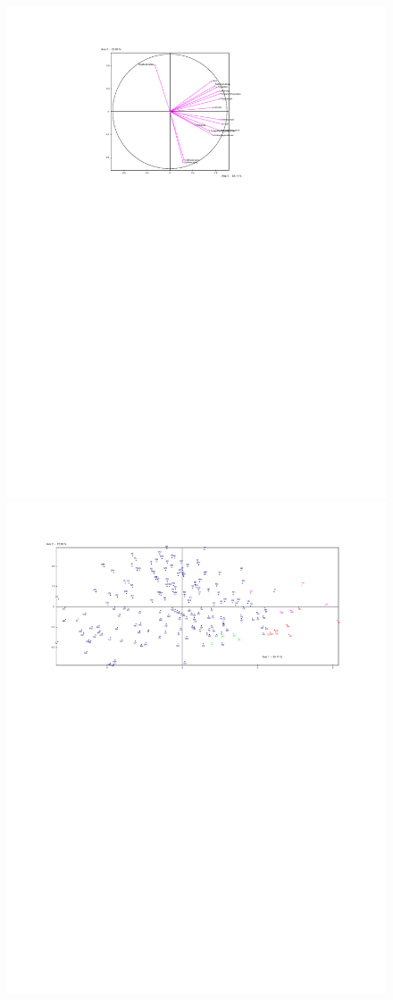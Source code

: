 \documentclass[a4paper,10pt,twocolumn]{article}
\begin{document}
\begin{figure}[!ht]
\begin{center}
\includegraphics[width=16cm]{r2.pdf}
\includegraphics[width=17cm]{r1.pdf}

\end{center}
\end{figure}
\end{document}
